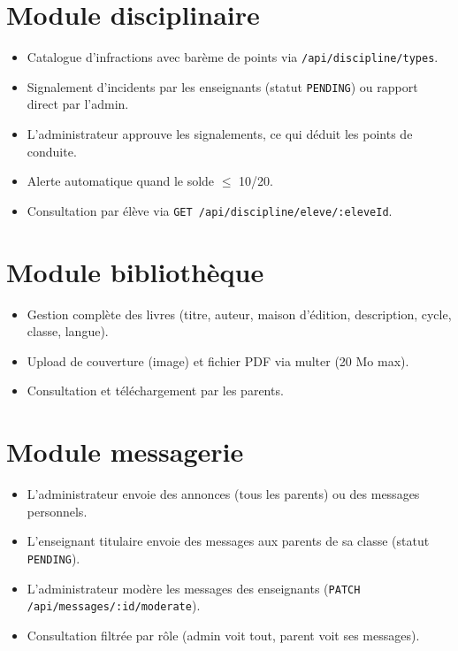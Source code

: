 \documentclass[12pt,a4paper]{report}
\begin{document}
\section{Module disciplinaire}
\begin{itemize}[leftmargin=*]
    \item Catalogue d'infractions avec barème de points via \texttt{/api/discipline/types}.
    \item Signalement d'incidents par les enseignants (statut \texttt{PENDING}) ou rapport direct par l'admin.
    \item L'administrateur approuve les signalements, ce qui déduit les points de conduite.
    \item Alerte automatique quand le solde $\le$ 10/20.
    \item Consultation par élève via \texttt{GET /api/discipline/eleve/:eleveId}.
\end{itemize}
 
\section{Module bibliothèque}
\begin{itemize}[leftmargin=*]
    \item Gestion complète des livres (titre, auteur, maison d'édition, description, cycle, classe, langue).
    \item Upload de couverture (image) et fichier PDF via multer (20 Mo max).
    \item Consultation et téléchargement par les parents.
\end{itemize}
 
\section{Module messagerie}
\begin{itemize}[leftmargin=*]
    \item L'administrateur envoie des annonces (tous les parents) ou des messages personnels.
    \item L'enseignant titulaire envoie des messages aux parents de sa classe (statut \texttt{PENDING}).
    \item L'administrateur modère les messages des enseignants (\texttt{PATCH /api/messages/:id/moderate}).
    \item Consultation filtrée par rôle (admin voit tout, parent voit ses messages).
\end{itemize}
 
\end{document}
